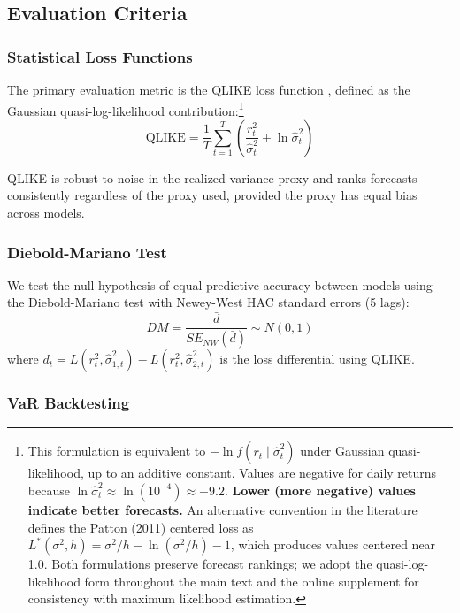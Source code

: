 \subsection{Evaluation Criteria}

\subsubsection{Statistical Loss Functions}

The primary evaluation metric is the QLIKE loss function \citep{patton2011}, defined as the Gaussian quasi-log-likelihood contribution:\footnote{This formulation is equivalent to $-\ln f(r_t \mid \hat{\sigma}^2_t)$ under Gaussian quasi-likelihood, up to an additive constant. Values are negative for daily returns because $\ln \hat{\sigma}^2_t \approx \ln(10^{-4}) \approx -9.2$. \textbf{Lower (more negative) values indicate better forecasts.} An alternative convention in the literature defines the Patton (2011) centered loss as $L^*(\sigma^2, h) = \sigma^2/h - \ln(\sigma^2/h) - 1$, which produces values centered near 1.0. Both formulations preserve forecast rankings; we adopt the quasi-log-likelihood form throughout the main text and the online supplement for consistency with maximum likelihood estimation.}
\begin{equation}
\text{QLIKE} = \frac{1}{T} \sum_{t=1}^{T} \left( \frac{r^2_t}{\hat{\sigma}^2_t} + \ln \hat{\sigma}^2_t \right)
\label{eq:qlike}
\end{equation}

QLIKE is robust to noise in the realized variance proxy and ranks forecasts consistently regardless of the proxy used, provided the proxy has equal bias across models.

\subsubsection{Diebold-Mariano Test}

We test the null hypothesis of equal predictive accuracy between models using the Diebold-Mariano test \citep{diebold1995} with Newey-West HAC standard errors (5 lags):
\begin{equation}
DM = \frac{\bar{d}}{SE_{NW}(\bar{d})} \sim N(0,1)
\end{equation}
where $d_t = L(r^2_t, \hat{\sigma}^2_{1,t}) - L(r^2_t, \hat{\sigma}^2_{2,t})$ is the loss differential using QLIKE.

\subsubsection{VaR Backtesting}

